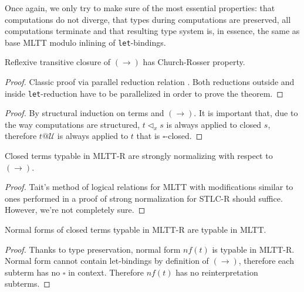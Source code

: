\documentclass[acmsmall, review, screen, authorversion]{acmart}
\begin{document}
Once again, we only try to make sure of the most essential
properties: that computations do not diverge, that types during
computations are preserved, all computations terminate and that
resulting type system is, in essence, the same as base MLTT modulo
inlining of \texttt{let}-bindings.

\begin{theorem}
    Reflexive transitive closure of $(\to)$ has Church-Rosser
    property.
\end{theorem}
\begin{proof}
    Classic proof via parallel reduction relation \cite{CRproof}.
    Both reductions outside and inside \texttt{let}-reduction have to
    be parallelized in order to prove the theorem.
\end{proof}

\begin{theorem}
\end{theorem}
\begin{proof}
    By structural induction on terms and $(\to)$. It is important
    that, due to the way computations are structured,
    $t\triangleleft_x s$ is always applied to closed $s$, therefore
    $t@\mathcal{U}$ is always applied to $t$ that is
    $\square$-closed.
\end{proof}

\begin{theorem}
    Closed terms typable in MLTT-R are strongly normalizing with
    respect to $(\to)$.
\end{theorem}
\begin{proof}
    Tait's method of logical relations for MLTT with modifications
    similar to ones performed in a proof of strong normalization for
    STLC-R should suffice. However, we're not completely sure.
\end{proof}

\begin{theorem}
    Normal forms of closed terms typable in MLTT-R are typable in
    MLTT.
\end{theorem}
\begin{proof}
    Thanks to type preservation, normal form $nf(t)$ is typable in
    MLTT-R. Normal form cannot contain let-bindings by definition of
    $(\to)$, therefore each subterm has no $\square$ in context.
    Therefore $nf(t)$ has no reinterpretation subterms.
\end{proof}
\end{document}
